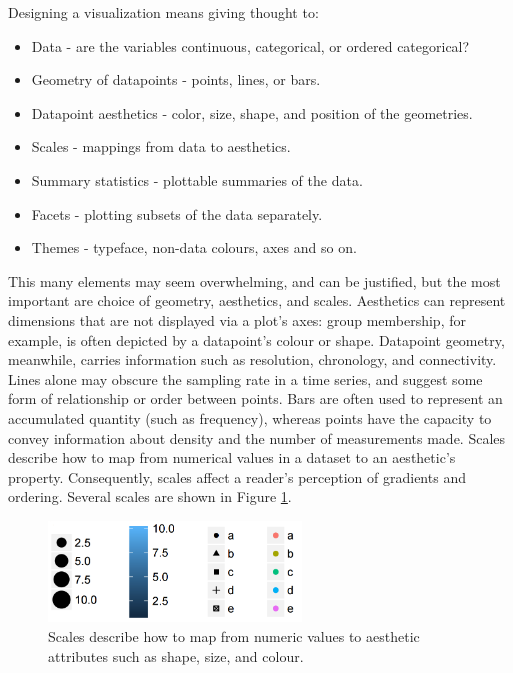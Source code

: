 \documentclass[11pt,a4paper,article]{memoir} %
\begin{document}
Designing a visualization means giving thought to:
\begin{itemize}
\item Data - are the variables continuous, categorical, or ordered categorical?
\item Geometry of datapoints - points, lines, or bars.
\item Datapoint aesthetics - color, size, shape, and position of the geometries.
\item Scales - mappings from data to aesthetics.
\item Summary statistics - plottable summaries of the data.
\item Facets - plotting subsets of the data separately.
\item Themes - typeface, non-data colours, axes and so on.
\end{itemize}
This many elements may seem overwhelming, and can be justified, but the most important are choice of geometry, aesthetics, and scales. Aesthetics can represent dimensions that are not displayed via a plot's axes: group membership, for example, is often depicted by a datapoint's colour or shape. Datapoint geometry, meanwhile, carries information such as resolution, chronology, and connectivity. Lines alone may obscure the sampling rate in a time series, and suggest some form of relationship or order between points. Bars are often used to represent an accumulated quantity (such as frequency), whereas points have the capacity to convey information about density and the number of measurements made. Scales describe how to map from numerical values in a dataset to an aesthetic's property. Consequently, scales affect a reader's perception of gradients and ordering. Several scales are shown in Figure \ref{fig:scales}.
\begin{figure}[h!]
\centering
\includegraphics[width=0.6\textwidth]{scales.png}
\caption{Scales describe how to map from numeric values to aesthetic attributes such as shape, size, and colour.}
\label{fig:scales}
\end{figure}
\vspace{-14pt}
\end{document}
